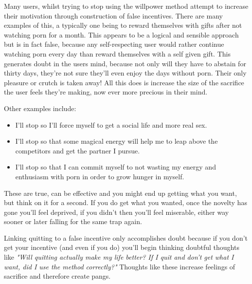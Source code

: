 \documentclass[easypeasy.tex]{subfiles}
\begin{document}
Many users, whilst trying to stop using the willpower method attempt to increase their motivation through construction of false incentives. There are many examples of this, a typically one being to reward themselves with gifts after not watching porn for a month. This appears to be a logical and sensible approach but is in fact false, because any self-respecting user would rather continue watching porn every day than reward themselves with a self given gift. This generates doubt in the users mind, because not only will they have to abstain for thirty days, they're not sure they'll even enjoy the days without porn. Their only pleasure or crutch is taken away! All this does is increase the size of the sacrifice the user feels they're making, now ever more precious in their mind.

Other examples include:
\begin{itemize}
  \item I'll stop so I'll force myself to get a social life and more real sex.
  \item I'll stop so that some magical energy will help me to leap above the competitors and get the partner I pursue.
  \item I'll stop so that I can commit myself to not wasting my energy and enthusiasm with porn in order to grow hunger in myself.
\end{itemize}

These are true, can be effective and you might end up getting what you want, but think on it for a second. If you do get what you wanted, once the novelty has gone you'll feel deprived, if you didn't then you'll feel miserable, either way sooner or later falling for the same trap again.

Linking quitting to a false incentive only accomplishes doubt because if you don't get your incentive (and even if you do) you'll begin thinking doubtful thoughts like \textit{"Will quitting actually make my life better? If I quit and don't get what I want, did I use the method correctly?"} Thoughts like these increase feelings of sacrifice and therefore create pangs.
\end{document}
